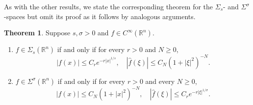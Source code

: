 \documentclass[11pt,a4paper,reqno]{amsart}
\numberwithin{equation}{section}
\theoremstyle{definition}
\newtheorem{thm}{Theorem}[section]
\theoremstyle{definition}
\begin{document}
As with the other results, we state the corresponding theorem for the $\Sigma_s$- and $\Sigma^\sigma$-spaces but omit its proof as it follows by analogous arguments.
\begin{thm}\label{thm:SigsFT}
Suppose $s,\sigma>0$ and $f\in C^\infty(\mathbb{R}^n)$.
\begin{enumerate}[label=(\alph*)]

    \item $f\in \Sigma_s(\mathbb{R}^n)$ if and only if for every $r>0$ and $N\geq 0$,
    \begin{equation}\label{eq:Sigmasaltchar}
        |f(x)|\leq C_r e^{-r|x|^{1/s}}, \quad |\hat{f}(\xi)|\leq C_N (1+|\xi|^2)^{-N}. 
    \end{equation}
    \item $f\in \Sigma^\sigma(\mathbb{R}^n)$ if and only if for every $r>0$ and every $N\geq 0$,
    \begin{equation}\label{eq:Sigmasigaltchar}
        |f(x)|\leq C_N (1+|x|^2)^{-N} , \quad |\hat{f}(\xi)|\leq C_r e^{-r|\xi|^{1/\sigma}}.
    \end{equation}
\end{enumerate}
\end{thm}
\end{document}
